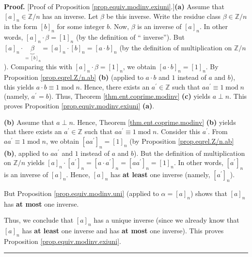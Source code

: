 \documentclass[numbers=enddot,12pt,final,onecolumn,notitlepage]{scrartcl}%
\numberwithin{exer}{subsection}
\theoremstyle{definition}
\newenvironment{proof}[1][Proof]{\noindent\textbf{#1.} }{\ \rule{0.5em}{0.5em}}
\begin{document}
\begin{proof}
[Proof of Proposition \ref{prop.equiv.modinv.exiuni}.]\textbf{(a)} Assume that
$\left[  a\right]  _{n}\in\mathbb{Z}/n$ has an inverse. Let $\beta$ be this
inverse. Write the residue class $\beta\in\mathbb{Z}/n$ in the form $\left[
b\right]  _{n}$ for some integer $b$. Now, $\beta$ is an inverse of $\left[
a\right]  _{n}$. In other words, $\left[  a\right]  _{n}\cdot\beta=\left[
1\right]  _{n}$ (by the definition of \textquotedblleft
inverse\textquotedblright). But $\left[  a\right]  _{n}\cdot\underbrace{\beta
}_{=\left[  b\right]  _{n}}=\left[  a\right]  _{n}\cdot\left[  b\right]
_{n}=\left[  a\cdot b\right]  _{n}$ (by the definition of multiplication on
$\mathbb{Z}/n$). Comparing this with $\left[  a\right]  _{n}\cdot\beta=\left[
1\right]  _{n}$, we obtain $\left[  a\cdot b\right]  _{n}=\left[  1\right]
_{n}$. By Proposition \ref{prop.eqrel.Z/n.ab} \textbf{(b)} (applied to $a\cdot
b$ and $1$ instead of $a$ and $b$), this yields $a\cdot b\equiv
1\operatorname{mod}n$. Hence, there exists an $a^{\prime}\in\mathbb{Z}$ such
that $aa^{\prime}\equiv1\operatorname{mod}n$ (namely, $a^{\prime}=b$). Thus,
Theorem \ref{thm.ent.coprime.modinv} \textbf{(c)} yields $a\perp n$. This
proves Proposition \ref{prop.equiv.modinv.exiuni} \textbf{(a)}.

\textbf{(b)} Assume that $a\perp n$. Hence, Theorem
\ref{thm.ent.coprime.modinv} \textbf{(b)} yields that there exists an
$a^{\prime}\in\mathbb{Z}$ such that $aa^{\prime}\equiv1\operatorname{mod}n$.
Consider this $a^{\prime}$. From $aa^{\prime}\equiv1\operatorname{mod}n$, we
obtain $\left[  aa^{\prime}\right]  _{n}=\left[  1\right]  _{n}$ (by
Proposition \ref{prop.eqrel.Z/n.ab} \textbf{(b)}, applied to $aa^{\prime}$ and
$1$ instead of $a$ and $b$). But the definition of multiplication on
$\mathbb{Z}/n$ yields $\left[  a\right]  _{n}\cdot\left[  a^{\prime}\right]
_{n}=\left[  a\cdot a^{\prime}\right]  _{n}=\left[  aa^{\prime}\right]
_{n}=\left[  1\right]  _{n}$. In other words, $\left[  a^{\prime}\right]
_{n}$ is an inverse of $\left[  a\right]  _{n}$. Hence, $\left[  a\right]
_{n}$ has \textbf{at least }one inverse (namely, $\left[  a^{\prime}\right]
_{n}$).

But Proposition \ref{prop.equiv.modinv.uni} (applied to $\alpha=\left[
a\right]  _{n}$) shows that $\left[  a\right]  _{n}$ has \textbf{at most }one inverse.

Thus, we conclude that $\left[  a\right]  _{n}$ has a unique inverse (since we
already know that $\left[  a\right]  _{n}$ has \textbf{at least }one inverse
and has \textbf{at most }one inverse). This proves Proposition
\ref{prop.equiv.modinv.exiuni}.
\end{proof}
\end{document}
